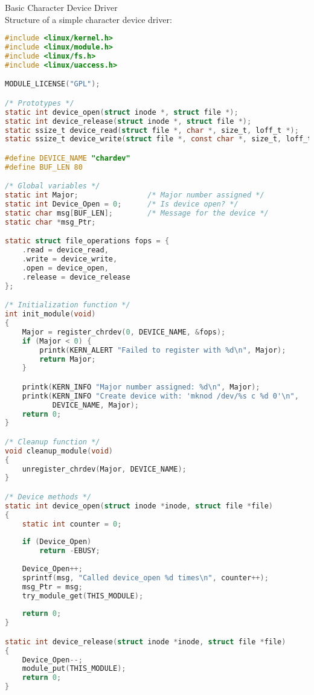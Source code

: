 \begin{code}{Basic Character Device Driver}\\
    Structure of a simple character device driver:
    
\begin{lstlisting}[language=C, style=basesmol]
#include <linux/kernel.h>
#include <linux/module.h>
#include <linux/fs.h>
#include <linux/uaccess.h>

MODULE_LICENSE("GPL");

/* Prototypes */
static int device_open(struct inode *, struct file *);
static int device_release(struct inode *, struct file *);
static ssize_t device_read(struct file *, char *, size_t, loff_t *);
static ssize_t device_write(struct file *, const char *, size_t, loff_t *);

#define DEVICE_NAME "chardev"
#define BUF_LEN 80

/* Global variables */
static int Major;                /* Major number assigned */
static int Device_Open = 0;      /* Is device open? */
static char msg[BUF_LEN];        /* Message for the device */
static char *msg_Ptr;

static struct file_operations fops = {
    .read = device_read,
    .write = device_write,
    .open = device_open,
    .release = device_release
};

/* Initialization function */
int init_module(void)
{
    Major = register_chrdev(0, DEVICE_NAME, &fops);
    if (Major < 0) {
        printk(KERN_ALERT "Failed to register with %d\n", Major);
        return Major;
    }

    printk(KERN_INFO "Major number assigned: %d\n", Major);
    printk(KERN_INFO "Create device with: 'mknod /dev/%s c %d 0'\n", 
           DEVICE_NAME, Major);
    return 0;
}

/* Cleanup function */
void cleanup_module(void)
{
    unregister_chrdev(Major, DEVICE_NAME);
}

/* Device methods */
static int device_open(struct inode *inode, struct file *file)
{
    static int counter = 0;
    
    if (Device_Open)
        return -EBUSY;
        
    Device_Open++;
    sprintf(msg, "Called device_open %d times\n", counter++);
    msg_Ptr = msg;
    try_module_get(THIS_MODULE);
    
    return 0;
}

static int device_release(struct inode *inode, struct file *file)
{
    Device_Open--;
    module_put(THIS_MODULE);
    return 0;
}


\end{lstlisting}
\end{code}
